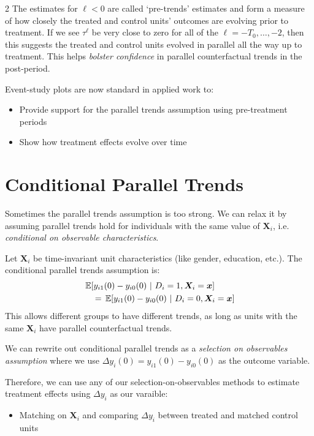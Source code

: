 \documentclass[12pt]{article}
\begin{document}
\begin{multicols}{2}
The estimates for $\ell < 0$ are called `pre-trends' estimates and form a measure of how closely the treated and control units' outcomes are evolving prior to treatment. 
If we see $\tau^\ell$ be very close to zero for all of the $\ell = -T_0, \dots, -2$, then this suggests the treated and control units evolved in parallel all the way up to treatment.
This helps \emph{bolster confidence} in parallel counterfactual trends in the post-period. 

Event-study plots are now standard in applied work to:
\begin{itemize}
  \item Provide support for the parallel trends assumption using pre-treatment periods
  
  \item Show how treatment effects evolve over time
\end{itemize}

\section*{Conditional Parallel Trends}

Sometimes the parallel trends assumption is too strong.
We can relax it by assuming parallel trends hold for individuals with the same value of $\bm{X}_i$, i.e. \emph{conditional on observable characteristics}.

Let $\bm{X}_i$ be time-invariant unit characteristics (like gender, education, etc.).
The conditional parallel trends assumption is:
\begin{align*}
  &\expec{y_{i1}(0) - y_{i0}(0)}{D_i = 1, \bm{X}_i = \bm{x}} \\
  &\quad = \expec{y_{i1}(0) - y_{i0}(0)}{D_i = 0, \bm{X}_i = \bm{x}}
\end{align*}
This allows different groups to have different trends, as long as units with the same $\bm{X}_i$ have parallel counterfactual trends.

We can rewrite out conditional parallel trends as a \emph{selection on observables assumption} where we use $\Delta y_i(0) = y_{i1}(0) - y_{i0}(0)$ as the outcome variable.

Therefore, we can use any of our selection-on-observables methods to estimate treatment effects using $\Delta y_i$ as our varaible:
\begin{itemize}
  \item Matching on $\bm{X}_i$ and comparing $\Delta y_i$ between treated and matched control units
  

\end{itemize}
\end{multicols}
\end{document}
